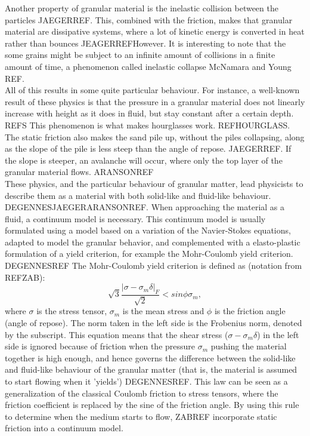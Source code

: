 Another property of granular material is the inelastic collision between the particles JAEGERREF. This, combined with the friction, makes that granular material are dissipative systems, where a lot of kinetic energy is converted in heat rather than bounces JEAGERREFHowever. It is interesting to note that the some grains might be subject to an infinite amount of collisions in a finite amount of time, a phenomenon called inelastic collapse McNamara and Young REF.\\

All of this results in some quite particular behaviour. For instance, a well-known result of these physics is that the pressure in a granular material does not linearly increase with height as it does in fluid, but stay constant after a certain depth. REFS This phenomenon is what makes hourglasses work. REFHOURGLASS. The static friction also makes the sand pile up, without the piles collapsing, along as the slope of the pile is less steep than the angle of repose. JAEGERREF. If the slope is steeper, an avalanche will occur, where only the top layer of the granular material flows. ARANSONREF\\

These physics, and the particular behaviour of granular matter, lead physicists to describe them as a material with both solid-like and fluid-like behaviour. DEGENNESJAEGERARANSONREF. When approaching the material as a fluid, a continuum model is necessary. This continuum model is usually formulated using a model based on a variation of the Navier-Stokes equations, adapted to model the granular behavior, and complemented with a elasto-plastic formulation of a yield criterion, for example the Mohr-Coulomb yield criterion. DEGENNESREF The Mohr-Coulomb yield criterion is defined as (notation from REFZAB):
\begin{equation} \label{mohr_phys}
\sqrt{3} \frac{|\sigma - \sigma_m \delta |_F}{\sqrt{2}} < sin \phi \sigma_m,
\end{equation}
where $\sigma$ is the stress tensor, $\sigma_m$ is the mean stress and $\phi$ is the friction angle (angle of repose). The norm taken in the left side is the Frobenius norm, denoted by the subscript. This equation means that the shear stress ($\sigma -\sigma_m \delta$) in the left side is ignored because of friction when the pressure $\sigma_m$ pushing the material together is high enough, and hence governs the difference between the solid-like and fluid-like behaviour of the granular matter (that is, the material is assumed to start flowing when it 'yields') DEGENNESREF. This law can be seen as a generalization of the classical Coulomb friction to stress tensors, where the friction coefficient is replaced by the sine of the friction angle. By using this rule to determine when the medium starts to flow, ZABREF incorporate static friction into a continuum model.\\

